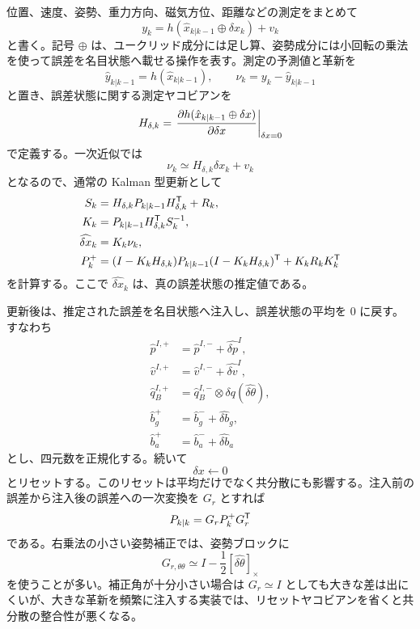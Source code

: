 位置、速度、姿勢、重力方向、磁気方位、距離などの測定をまとめて
\begin{equation}
  y_k=h(\hat{x}_{k|k-1}\oplus\delta x_k)+v_k
\end{equation}
と書く。記号 $\oplus$ は、ユークリッド成分には足し算、姿勢成分には小回転の乗法を使って誤差を名目状態へ載せる操作を表す。測定の予測値と革新を
\begin{equation}
  \hat{y}_{k|k-1}=h(\hat{x}_{k|k-1}),
  \qquad
  \nu_k=y_k-\hat{y}_{k|k-1}
\end{equation}
と置き、誤差状態に関する測定ヤコビアンを
\begin{equation}
  H_{\delta,k}
  =
  \left.
  \frac{\partial h(\hat{x}_{k|k-1}\oplus\delta x)}
       {\partial\delta x}
  \right|_{\delta x=0}
\end{equation}
で定義する。一次近似では
\begin{equation}
  \nu_k\simeq H_{\delta,k}\delta x_k+v_k
\end{equation}
となるので、通常の Kalman 型更新として
\begin{align}
  S_k&=H_{\delta,k}P_{k|k-1}H_{\delta,k}^{\mathsf{T}}+R_k,\\
  K_k&=P_{k|k-1}H_{\delta,k}^{\mathsf{T}} S_k^{-1},\\
  \widehat{\delta x}_k&=K_k\nu_k,\\
  P^+_k
  &=(I-K_kH_{\delta,k})P_{k|k-1}
    (I-K_kH_{\delta,k})^{\mathsf{T}}+K_kR_kK_k^{\mathsf{T}}
\end{align}
を計算する。ここで $\widehat{\delta x}_k$ は、真の誤差状態の推定値である。

更新後は、推定された誤差を名目状態へ注入し、誤差状態の平均を 0 に戻す。すなわち
\begin{align}
  \hat{p}^{I,+}&=\hat{p}^{I,-}+\widehat{\delta p}^I,\\
  \hat{v}^{I,+}&=\hat{v}^{I,-}+\widehat{\delta v}^I,\\
  \hat{q}^{I,+}_B
  &=
  \hat{q}^{I,-}_B\otimes
  \delta q(\widehat{\delta\theta}),\\
  \hat{b}^+_g&=\hat{b}^-_g+\widehat{\delta b}_g,\\
  \hat{b}^+_a&=\hat{b}^-_a+\widehat{\delta b}_a
\end{align}
とし、四元数を正規化する。続いて
\begin{equation}
  \delta x\leftarrow0
\end{equation}
とリセットする。このリセットは平均だけでなく共分散にも影響する。注入前の誤差から注入後の誤差への一次変換を $G_r$ とすれば
\begin{equation}
  P_{k|k}=G_rP^+_kG_r^{\mathsf{T}}
\end{equation}
である。右乗法の小さい姿勢補正では、姿勢ブロックに
\begin{equation}
  G_{r,\theta\theta}
  \simeq
  I-\frac{1}{2}[\widehat{\delta\theta}]_\times
\end{equation}
を使うことが多い。補正角が十分小さい場合は $G_r\simeq I$ としても大きな差は出にくいが、大きな革新を頻繁に注入する実装では、リセットヤコビアンを省くと共分散の整合性が悪くなる。

